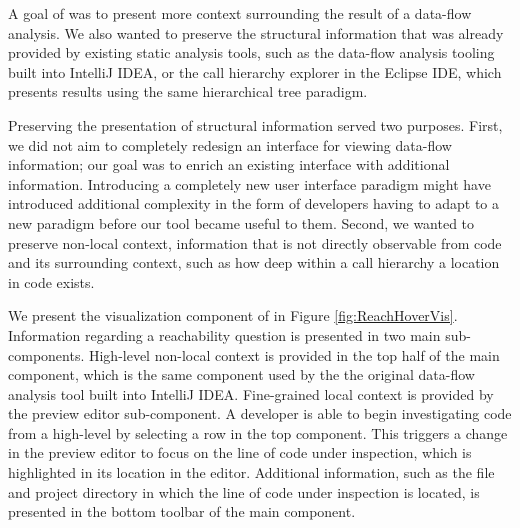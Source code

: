 \noindent A goal of \toolname{} was to present more context surrounding the 
result of a data-flow analysis. 
We also wanted to preserve the structural information that was
already provided by existing static analysis tools, such as the data-flow
analysis tooling built into IntelliJ IDEA, or the call hierarchy explorer in
the Eclipse \ac{IDE}, which presents results using the same hierarchical
tree paradigm.

\par Preserving the presentation of structural information served two purposes.
First, we did not aim to completely redesign an interface for viewing data-flow
information;
our goal was to enrich an existing interface with additional information.
Introducing a completely new user interface paradigm might have introduced
additional complexity in the form of developers having to adapt to a new 
paradigm before our tool became useful to them.
Second, we wanted to preserve non-local context, \ie information that is not
directly observable from code and its surrounding context, such as how deep
within a call hierarchy a location in code exists.

\par We present the visualization component of \toolname{} in Figure
\ref{fig:ReachHoverVis}.
Information regarding a reachability question is presented in two main
sub-components.
High-level non-local context is provided in the top half of the main component,
which is the same component used by the the original data-flow analysis tool
built into IntelliJ IDEA.
Fine-grained local context is provided by the preview editor sub-component.
A developer is able to begin investigating code from a high-level by selecting
a row in the top component.
This triggers a change in the preview editor to focus on the line of code under
inspection, which is highlighted in its location in the editor.
Additional information, such as the file and project directory in which the
line of code under inspection is located, is presented in the bottom
toolbar of the main component.

